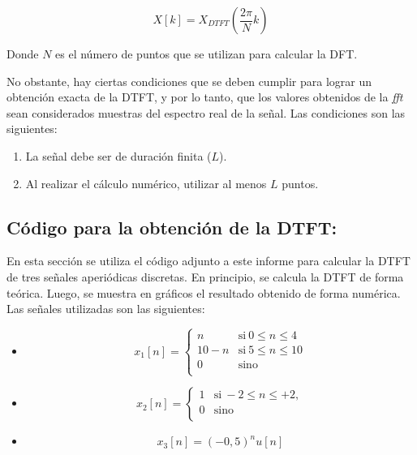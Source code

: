 \documentclass[11pt,a4paper]{article}
\begin{document}
        \begin{equation}
            X[k]=X_{DTFT}\left(  \frac{2 \pi}{N} k \right)
        \end{equation}

        Donde $N$ es el número de puntos que se utilizan para calcular la DFT.

        No obstante, hay ciertas condiciones que se deben cumplir para lograr un obtención exacta de la DTFT, y por lo tanto, que los valores obtenidos de la \textit{fft} sean considerados muestras del espectro real de la señal. Las condiciones son las siguientes:

        \begin{enumerate}
            \item La señal debe ser de duración finita ($L$).
            \item Al realizar el cálculo numérico, utilizar al menos $L$ puntos.
        \end{enumerate}
    
    \subsection{Código para la obtención de la DTFT:}
    En esta sección se utiliza el código adjunto a este informe para calcular la DTFT de tres señales aperiódicas discretas. En principio, se calcula la DTFT de forma teórica. Luego, se muestra en gráficos el resultado obtenido de forma numérica. Las señales utilizadas son las siguientes:
    \begin{itemize}
    \item \begin{equation}
    x_{1}[n] = \left\{ 
        \begin{array}{ll} 
        n & \mathrm{si\ } 0\leq n \leq 4 \\
        10-n & \mathrm{si\ } 5\leq n \leq 10 \\
        0 & \mathrm{sino\ } \\
        \end{array} 
        \right.
    \end{equation}
    
    \item \begin{equation} 
        x_{2}[n] = \left\{ 
        \begin{array}{ll} 
        1 & \mathrm{si\ } -2\leq n \leq +2, \\
        0 & \mathrm{sino\ } \\
        \end{array} 
        \right.
    \end{equation}
    
    \item \begin{equation} 
        x_{3}[n]=(-0,5)^{n}u[n]
    \end{equation}

    \end{itemize}   
    
\end{document}
